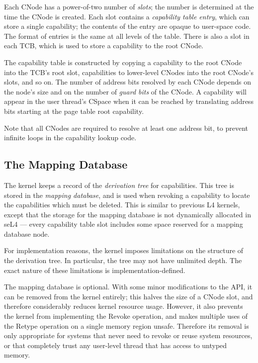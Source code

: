 Each CNode has a power-of-two number of \emph{slots}; the number is determined
at the time the CNode is created. Each slot contains a \emph{capability table
entry}, which can store a single capability; the contents of the entry are
opaque to user-space code. The format of entries is the same at all levels of
the table. There is also a slot in each TCB, which is used to store a
capability to the root CNode.

The capability table is constructed by copying a capability to the root CNode
into the TCB's root slot, capabilities to lower-level CNodes into the root
CNode's slots, and so on. The number of address bits resolved by each CNode
depends on the node's size and on the number of \emph{guard bits} of the CNode. 
A capability will appear in the user thread's CSpace when it can be reached by
translating address bits starting at the page table root capability.

Note that all CNodes are required to resolve at least one address bit, to
prevent infinite loops in the capability lookup code.

\subsection{The Mapping Database}\label{sec:overview.cspace.mdb}

The kernel keeps a record of the \emph{derivation tree} for capabilities. This
tree is stored in the \emph{mapping database}, and is used when revoking a
capability to locate the capabilities which must be deleted. This is similar to
previous L4 kernels, except that the storage for the mapping database is not
dynamically allocated in seL4 --- every capability table slot includes some
space reserved for a mapping database node.

For implementation reasons, the kernel imposes limitations on the structure of
the derivation tree. In particular, the tree may not have unlimited depth. The
exact nature of these limitations is implementation-defined.

The mapping database is optional. With some minor modifications to the API, it
can be removed from the kernel entirely; this halves the size of a CNode slot,
and therefore considerably reduces kernel resource usage. However, it also
prevents the kernel from implementing the Revoke operation, and makes multiple
uses of the Retype operation on a single memory region unsafe. Therefore its
removal is only appropriate for systems that never need to revoke or reuse
system resources, or that completely trust any user-level thread that has
access to untyped memory.

